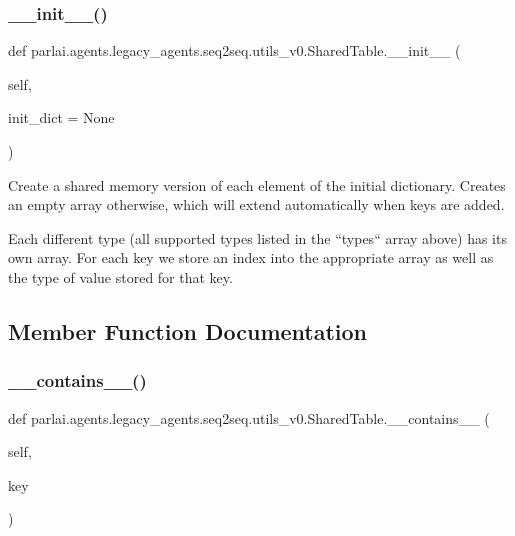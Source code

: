 \subsubsection{\texorpdfstring{\+\_\+\+\_\+init\+\_\+\+\_\+()}{\_\_init\_\_()}}
{\footnotesize\ttfamily def parlai.\+agents.\+legacy\+\_\+agents.\+seq2seq.\+utils\+\_\+v0.\+Shared\+Table.\+\_\+\+\_\+init\+\_\+\+\_\+ (\begin{DoxyParamCaption}\item[{}]{self,  }\item[{}]{init\+\_\+dict = {\ttfamily None} }\end{DoxyParamCaption})}

\begin{DoxyVerb}Create a shared memory version of each element of the initial dictionary.
Creates an empty array otherwise, which will extend automatically when keys are
added.

Each different type (all supported types listed in the ``types`` array above)
has its own array. For each key we store an index into the appropriate array as
well as the type of value stored for that key.
\end{DoxyVerb}
 

\subsection{Member Function Documentation}
\mbox{\label{classparlai_1_1agents_1_1legacy__agents_1_1seq2seq_1_1utils__v0_1_1SharedTable_ac40e68dfcfa7680874ee1088642e16ff}} 
\subsubsection{\texorpdfstring{\+\_\+\+\_\+contains\+\_\+\+\_\+()}{\_\_contains\_\_()}}
{\footnotesize\ttfamily def parlai.\+agents.\+legacy\+\_\+agents.\+seq2seq.\+utils\+\_\+v0.\+Shared\+Table.\+\_\+\+\_\+contains\+\_\+\+\_\+ (\begin{DoxyParamCaption}\item[{}]{self,  }\item[{}]{key }\end{DoxyParamCaption})}

